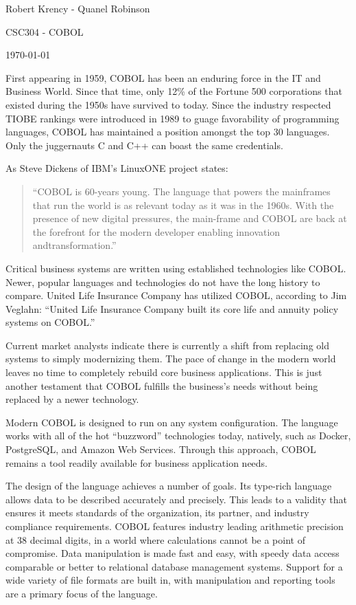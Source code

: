 \documentclass[12pt]{article}
\begin{document}
Robert Krency - Quanel Robinson

CSC304 - COBOL

\today

\vspace{0.5in}

First appearing in 1959, COBOL has been an enduring force in the IT and Business World. 
Since that time, only 12\% of the Fortune 500 corporations that existed during the 1950s have survived to today.
Since the industry respected TIOBE rankings were introduced in 1989 to guage favorability of programming languages, COBOL has maintained a position amongst the top 30 languages.
Only the juggernauts C and C++ can boast the same credentials.

As Steve Dickens of IBM's LinuxONE project states:
\begin{quote}
    ``COBOL  is  60-years  young.   The  language  that  powers  the  mainframes  that  run  the  world  is as relevant today as it was in the 1960s.  With the presence of new digital pressures, the main-frame and COBOL are back at the forefront for the modern developer enabling innovation andtransformation.''
\end{quote}

Critical business systems are written using established technologies like COBOL. 
Newer, popular languages and technologies do not have the long history to compare.
United Life Insurance Company has utilized COBOL, according to Jim Veglahn:
``United Life Insurance Company built its core life and annuity policy systems on COBOL.''

Current market analysts indicate there is currently a shift from replacing old systems to simply modernizing them.
The pace of change in the modern world leaves no time to completely rebuild core business applications.
This is just another testament that COBOL fulfills the business's needs without being replaced by a newer technology.

Modern COBOL is designed to run on any system configuration.
The language works with all of the hot ``buzzword'' technologies today, natively, such as Docker, PostgreSQL, and Amazon Web Services.
Through this approach, COBOL remains a tool readily available for business application needs.

The design of the language achieves a number of goals. 
Its type-rich language allows data to be described accurately and precisely.
This leads to a validity that ensures it meets standards of the organization, its partner, and industry compliance requirements.
COBOL features industry leading arithmetic precision at 38 decimal digits, in a world where calculations cannot be a point of compromise.
Data manipulation is made fast and easy, with speedy data access comparable or better to relational database management systems.
Support for a wide variety of file formats are built in, with manipulation and reporting tools are a primary focus of the language.
\end{document}
